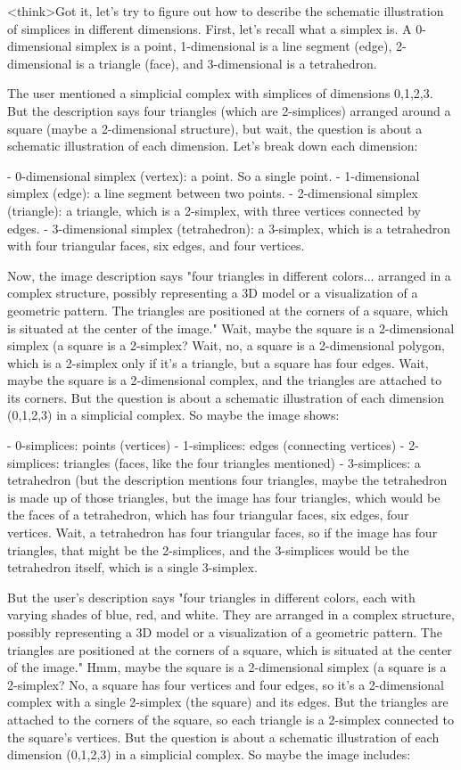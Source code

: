 <think>Got it, let's try to figure out how to describe the schematic illustration of simplices in different dimensions. First, let's recall what a simplex is. A 0-dimensional simplex is a point, 1-dimensional is a line segment (edge), 2-dimensional is a triangle (face), and 3-dimensional is a tetrahedron. 

The user mentioned a simplicial complex with simplices of dimensions 0,1,2,3. But the description says four triangles (which are 2-simplices) arranged around a square (maybe a 2-dimensional structure), but wait, the question is about a schematic illustration of each dimension. Let's break down each dimension:

- 0-dimensional simplex (vertex): a point. So a single point.
- 1-dimensional simplex (edge): a line segment between two points.
- 2-dimensional simplex (triangle): a triangle, which is a 2-simplex, with three vertices connected by edges.
- 3-dimensional simplex (tetrahedron): a 3-simplex, which is a tetrahedron with four triangular faces, six edges, and four vertices.

Now, the image description says "four triangles in different colors... arranged in a complex structure, possibly representing a 3D model or a visualization of a geometric pattern. The triangles are positioned at the corners of a square, which is situated at the center of the image." Wait, maybe the square is a 2-dimensional simplex (a square is a 2-simplex? Wait, no, a square is a 2-dimensional polygon, which is a 2-simplex only if it's a triangle, but a square has four edges. Wait, maybe the square is a 2-dimensional complex, and the triangles are attached to its corners. But the question is about a schematic illustration of each dimension (0,1,2,3) in a simplicial complex. So maybe the image shows:

- 0-simplices: points (vertices)
- 1-simplices: edges (connecting vertices)
- 2-simplices: triangles (faces, like the four triangles mentioned)
- 3-simplices: a tetrahedron (but the description mentions four triangles, maybe the tetrahedron is made up of those triangles, but the image has four triangles, which would be the faces of a tetrahedron, which has four triangular faces, six edges, four vertices. Wait, a tetrahedron has four triangular faces, so if the image has four triangles, that might be the 2-simplices, and the 3-simplices would be the tetrahedron itself, which is a single 3-simplex.

But the user's description says "four triangles in different colors, each with varying shades of blue, red, and white. They are arranged in a complex structure, possibly representing a 3D model or a visualization of a geometric pattern. The triangles are positioned at the corners of a square, which is situated at the center of the image." Hmm, maybe the square is a 2-dimensional simplex (a square is a 2-simplex? No, a square has four vertices and four edges, so it's a 2-dimensional complex with a single 2-simplex (the square) and its edges. But the triangles are attached to the corners of the square, so each triangle is a 2-simplex connected to the square's vertices. But the question is about a schematic illustration of each dimension (0,1,2,3) in a simplicial complex. So maybe the image includes:

